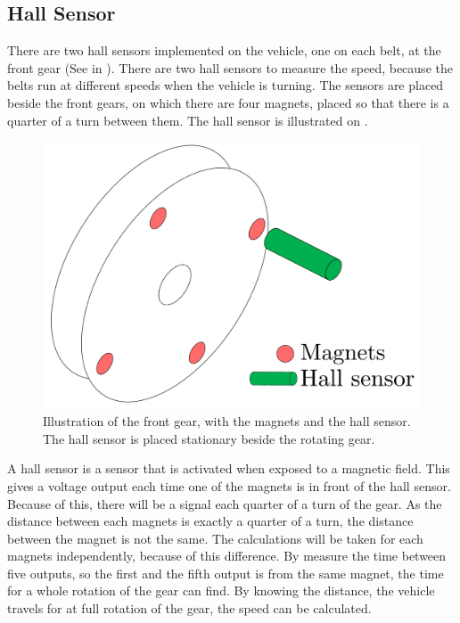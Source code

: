 \subsection{Hall Sensor}
There are two hall sensors implemented on the vehicle, one on each belt, at the front gear (See  in \secref{}). There are two hall sensors to measure the speed, because the belts run at different speeds when the vehicle is turning. The sensors are placed beside the front gears, on which there are four magnets, placed so that there is a quarter of a turn between them. The hall sensor is illustrated on .

 \begin{figure}[H]
	\centering
	\includegraphics[scale=0.5]{figures/HallSensor3D.pdf}
	\caption{Illustration of the front gear, with the magnets and the hall sensor. The hall sensor is placed stationary beside the rotating gear.}
	\label{HallSensor}
\end{figure}

A hall sensor is a sensor that is activated when exposed to a magnetic field. This gives a voltage output each time one of the magnets is in front of the hall sensor. Because of this, there will be a signal each quarter of a turn of the gear. As the distance between each magnets is exactly a quarter of a turn, the distance between the magnet is not the same. The calculations will be taken for each magnets independently, because of this difference.
By measure the time between five outputs, so the first and the fifth output is from the same magnet, the time for a whole rotation of the gear can find. By knowing the distance, the vehicle travels for at full rotation of the gear, the speed can be calculated.

